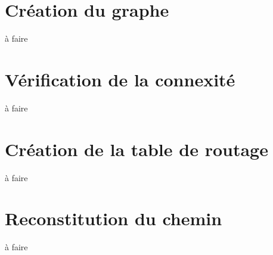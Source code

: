 \documentclass{article}
\begin{document}
\section{Création du graphe}
à faire
\section{Vérification de la connexité}
à faire
\section{Création de la table de routage}
à faire
\section{Reconstitution du chemin}
à faire
\end{document}
